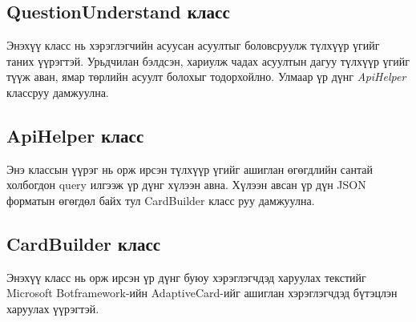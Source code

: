 \subsection{QuestionUnderstand класс}
Энэхүү класс нь хэрэглэгчийн асуусан асуултыг боловсруулж түлхүүр үгийг таних үүрэгтэй. Урьдчилан бэлдсэн, хариулж чадах асуултын дагуу түлхүүр үгийг түүж аван, ямар төрлийн асуулт болохыг тодорхойлно. Улмаар үр дүнг \textit{ApiHelper} классруу дамжуулна.
\subsection{ApiHelper класс}
Энэ классын үүрэг нь орж ирсэн түлхүүр үгийг ашиглан өгөгдлийн сантай холбогдон query илгээж үр дүнг хүлээн авна. Хүлээн авсан үр дүн JSON форматын өгөгдөл байх тул CardBuilder класс руу дамжуулна.
\subsection{CardBuilder класс}
Энэхүү класс нь орж ирсэн үр дүнг буюу хэрэглэгчдэд харуулах текстийг Microsoft Botframework-ийн AdaptiveCard-ийг ашиглан хэрэглэгчдэд бүтэцлэн харуулах үүрэгтэй.
